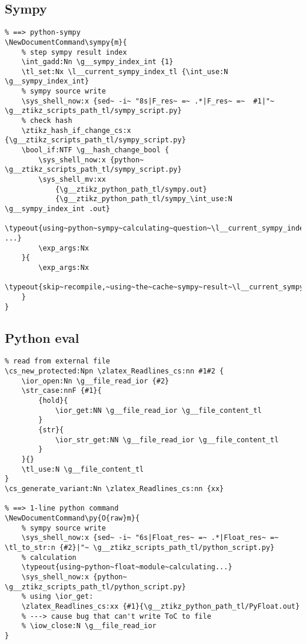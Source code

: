 \subsection{Sympy}
\begin{verbatim}
% ==> python-sympy
\NewDocumentCommand\sympy{m}{
    % step sympy result index
    \int_gadd:Nn \g__sympy_index_int {1}  
    \tl_set:Nx \l__current_sympy_index_tl {\int_use:N \g__sympy_index_int}
    % sympy source write
    \sys_shell_now:x {sed~ -i~ "8s|F_res~ =~ .*|F_res~ =~  #1|"~ \g__ztikz_scripts_path_tl/sympy_script.py}
    % check hash
    \ztikz_hash_if_change_cs:x {\g__ztikz_scripts_path_tl/sympy_script.py}
    \bool_if:NTF \g__hash_change_bool {
        \sys_shell_now:x {python~ \g__ztikz_scripts_path_tl/sympy_script.py}
        \sys_shell_mv:xx
            {\g__ztikz_python_path_tl/sympy.out}
            {\g__ztikz_python_path_tl/sympy_\int_use:N \g__sympy_index_int .out}
        \typeout{using~python~sympy~calculating~question~\l__current_sympy_index_tl ...}
        \exp_args:Nx 
    }{
        \exp_args:Nx 
        \typeout{skip~recompile,~using~the~cache~sympy~result~\l__current_sympy_index_tl}
    }
}
\end{verbatim}

\subsection{Python eval}
\begin{verbatim}
% read from external file 
\cs_new_protected:Npn \zlatex_Readlines_cs:nn #1#2 {
    \ior_open:Nn \g__file_read_ior {#2}
    \str_case:nnF {#1}{
        {hold}{
            \ior_get:NN \g__file_read_ior \g__file_content_tl
        }
        {str}{
            \ior_str_get:NN \g__file_read_ior \g__file_content_tl
        }
    }{}
    \tl_use:N \g__file_content_tl
}
\cs_generate_variant:Nn \zlatex_Readlines_cs:nn {xx}

% ==> 1-line python command
\NewDocumentCommand\py{O{raw}m}{
    % sympy source write
    \sys_shell_now:x {sed~ -i~ "6s|Float_res~ =~ .*|Float_res~ =~ \tl_to_str:n {#2}|"~ \g__ztikz_scripts_path_tl/python_script.py}
    % calculation
    \typeout{using~python~float~module~calculating...}
    \sys_shell_now:x {python~ \g__ztikz_scripts_path_tl/python_script.py}
    % using \ior_get: 
    \zlatex_Readlines_cs:xx {#1}{\g__ztikz_python_path_tl/PyFloat.out}
    % ---> cause bug that can't write ToC to file
    % \iow_close:N \g__file_read_ior
}
\end{verbatim}





